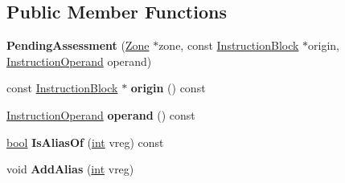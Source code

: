 \subsection*{Public Member Functions}
\begin{DoxyCompactItemize}
\item 
\mbox{\label{classv8_1_1internal_1_1compiler_1_1PendingAssessment_ad5a60f5537e9a9f7a626407135fe3207}} 
{\bfseries Pending\+Assessment} (\mbox{\hyperlink{classv8_1_1internal_1_1Zone}{Zone}} $\ast$zone, const \mbox{\hyperlink{classv8_1_1internal_1_1compiler_1_1InstructionBlock}{Instruction\+Block}} $\ast$origin, \mbox{\hyperlink{classv8_1_1internal_1_1compiler_1_1InstructionOperand}{Instruction\+Operand}} operand)
\item 
\mbox{\label{classv8_1_1internal_1_1compiler_1_1PendingAssessment_a374df574eafbc529a04f1315efd89a1e}} 
const \mbox{\hyperlink{classv8_1_1internal_1_1compiler_1_1InstructionBlock}{Instruction\+Block}} $\ast$ {\bfseries origin} () const
\item 
\mbox{\label{classv8_1_1internal_1_1compiler_1_1PendingAssessment_abad738c027b0ef3d9f4348176aebab90}} 
\mbox{\hyperlink{classv8_1_1internal_1_1compiler_1_1InstructionOperand}{Instruction\+Operand}} {\bfseries operand} () const
\item 
\mbox{\label{classv8_1_1internal_1_1compiler_1_1PendingAssessment_ad06665b7f7a9e9d961c4815540adcafa}} 
\mbox{\hyperlink{classbool}{bool}} {\bfseries Is\+Alias\+Of} (\mbox{\hyperlink{classint}{int}} vreg) const
\item 
\mbox{\label{classv8_1_1internal_1_1compiler_1_1PendingAssessment_a4dcc203f66cd6e26896fc7ddfdd0bee0}} 
void {\bfseries Add\+Alias} (\mbox{\hyperlink{classint}{int}} vreg)
\end{DoxyCompactItemize}
